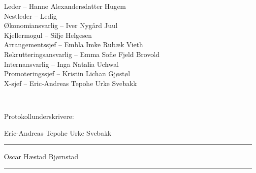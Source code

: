 \documentclass[10pt,norsk,a4paper,usenames,dvipsnames]{article}
\begin{document}
\begin{center}
    \LARGE Leder -- Hanne Alexandersdatter Hugem
    \\ Nestleder -- Ledig
    \\ Økonomiansvarlig -- Iver Nygård Juul
    \\ Kjellermogul -- Silje Helgesen
    \\ Arrangementssjef -- Embla Imke Rubæk Vieth
    \\ Rekrutteringsansvarlig -- Emma Sofie Fjeld Brovold
    \\ Internansvarlig -- Inga Natalia Uchwal
    \\ Promoteringssjef -- Kristin Lichan Gjøstøl
    \\ X-sjef -- Eric-Andreas Tepohe Urke Svebakk
\end{center}

\mbox{}
\\[24pt]

\begin{center}
\LARGE Protokollunderskrivere:\\[30pt]

\begin{multicols}{2}
    \Large 
    Eric-Andreas Tepohe Urke Svebakk\\[48pt]
    \rule{220pt}{1pt}
    
    Oscar Hæstad Bjørnstad\\[48pt]
    \rule{220pt}{1pt}
    
    
\end{multicols}
\end{center}

    

% 
\end{document}
